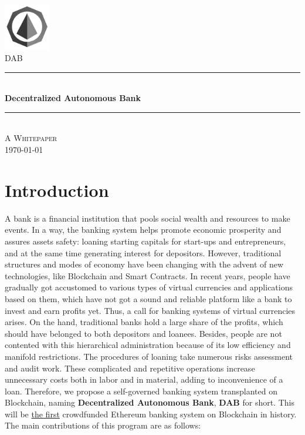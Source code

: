 \documentclass[review]{elsarticle}
\newcommand{\HRule}{\rule{\linewidth}{0.5mm}}
\begin{document}
\begin{titlepage}
\begin{center}

\includegraphics[width=0.15\textwidth]{Graphs/logo3.jpg}\\[0.6cm]    
\textsc{\huge DAB}\\[1cm]

\HRule \\[0.75cm]
{ \huge \bfseries Decentralized Autonomous Bank}\\[0.4cm]
\HRule \\[1.5cm]
\textsc{\LARGE A Whitepaper}\\[0.5cm]

\vfill
{\large \today}

\end{center}
\end{titlepage}

\section{Introduction}
A bank is a financial institution that pools social wealth and resources to make events. In a way, the banking system helps promote economic prosperity and assures assets safety: loaning starting capitals for start-ups and entrepreneurs, and at the same time generating interest for depositors. However, traditional structures and modes of economy have been changing with the advent of new technologies, like Blockchain and Smart Contracts. In recent years, people have gradually got accustomed to various types of virtual currencies and applications based on them, which have not got a sound and reliable platform like a bank to invest and earn profits yet. Thus, a call for banking systems of virtual currencies arises.
On the hand, traditional banks hold a large share of the profits, which should have belonged to both depositors and loanees. Besides, people are not contented with this hierarchical administration because of its low efficiency and manifold restrictions. The procedures of loaning take numerous risks assessment and audit work. These complicated and repetitive operations increase unnecessary costs both in labor and in material, adding to inconvenience of a loan.
Therefore, we propose a self-governed banking system transplanted on Blockchain, naming \textbf{Decentralized Autonomous Bank}, \textbf{DAB} for short. 
This will be \underline{the first} crowdfunded Ethereum banking system on Blockchain in history. The main contributions of this program are as follows:
\end{document}
